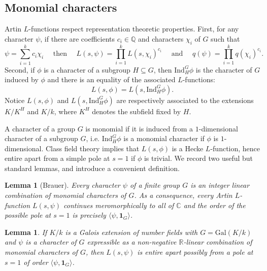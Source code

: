 \documentclass[12pt]{amsart}
\newtheorem{lemma}[theorem]{Lemma}
\theoremstyle{definition} \newtheorem{definition}[theorem]{Definition}
\theoremstyle{example} \newtheorem{example}[theorem]{Example}
\theoremstyle{remark} \newtheorem{remark}{Remark}[theorem]
\numberwithin{equation}{section}
\numberwithin{theorem}{section}
\newcommand{\Q}{\mathbb{Q}}
\newcommand{\Ind}{\mathrm{Ind}}
\begin{document}
\subsection{Monomial characters} Artin $L$-functions respect representation theoretic properties. 
First, for any character $\psi$, if there are  coefficients $c_i \in \Q$ and characters $\chi_i$ of $G$ such that
\begin{equation} 
	\label{eqn:Artin-Summation}
	\psi = \sum_{i=1}^k c_i \chi_{i} \quad \text{ then } \quad	L(s,\psi) = \prod_{i=1}^k L(s,\chi_{i})^{c_i} \quad \text{ and }\quad q(\psi) = \prod_{i=1}^k q(\chi_i)^{c_i}.  
\end{equation}
Second, if $\phi$ is a character of a subgroup $H \subseteq G$, then $\Ind_H^G \phi$ is the character of $G$ induced by $\phi$ and there is an equality of the associated $L$-functions:
\begin{equation} 
	\label{eqn:Artin-Induction}
L(s,\phi) = L(s,\Ind_H^G \phi).
\end{equation}
Notice $L(s,\phi)$ and $L(s,\Ind_H^G \phi)$ are respectively associated to the extensions $K/K^H$ and $K/k$, where $K^H$ denotes the subfield fixed by $H$. 

A character of a group $G$ is monomial if it is induced from a $1$-dimensional character  of a subgroup $G$, i.e. $\Ind_H^G \phi$ is a monomial character if $\phi$ is $1$-dimensional. Class field theory implies that $L(s,\phi)$ is a Hecke $L$-function, hence entire apart from a simple pole at $s=1$ if $\phi$ is trivial.  We record two useful but standard lemmas, and introduce a convenient definition.

\begin{lemma}[Brauer] \label{lem:Brauer}
Every character $\psi$ of a finite group $G$ is an integer linear combination of monomial characters of $G$.  
As a consequence, every Artin $L$-function $L(s,\psi)$ continues meromorphically to all of $\mathbb{C}$ and the order of the possible pole at $s=1$ is precisely $\langle \psi, \mathbf{1}_G\rangle$.
\end{lemma}

\begin{lemma}
	\label{lem:Monomial}
	If  $K/k$ is a Galois extension of number fields with $G = \mathrm{Gal}(K/k)$ and $\psi$ is a character of $G$ expressible as a non-negative $\mathbb{R}$-linear combination of monomial characters of $G$, then $L(s,\psi)$ is entire apart possibly from a pole at $s=1$ of order $\langle \psi,\mathbf{1}_G\rangle$. 
\end{lemma}
\end{document}
